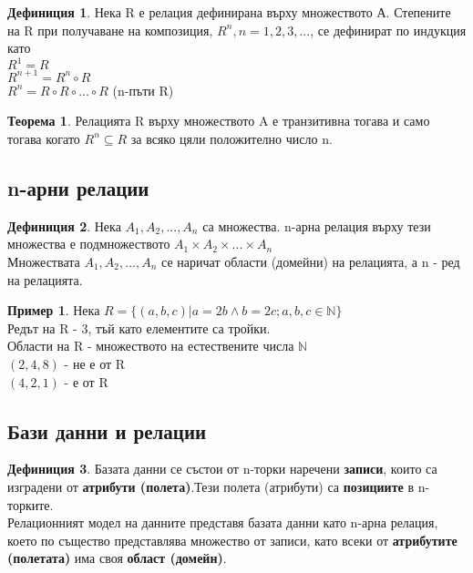 \documentclass[fleqn, 12pt]{article}
\theoremstyle{definition}
\newtheorem{example}{Пример}[subsection]
\newtheorem{definition}{Дефиниция}[subsection]
\newtheorem{theorem}{Теорема}[subsection]
\begin{document}
\begin{definition}
Нека R е релация дефинирана върху множеството А. Степените на R при получаване на композиция, $R^n, n = 1, 2, 3, ...$, се дефинират по индукция като \\
$R^1 = R$ \\
$R^{n+1} = R^n \circ R$ \\
$R^n = R \circ R \circ ... \circ R$ (n-пъти R)
\end{definition}

\begin{theorem}
Релацията R върху множеството A е транзитивна тогава и само тогава когато $R^n \subseteq R$ за всяко цяли положително число n.
\end{theorem}

\subsection{n-арни релации}

\begin{definition}
Нека $A_1, A_2, ..., A_n$ са множества. n-арна релация върху тези множества е подмножеството $A_1 \times A_2 \times ... \times A_n$ \\
Множествата $A_1, A_2, ..., A_n$ се наричат области (домейни) на релацията, а n - ред на релацията. 
\end{definition}

\begin{example}
Нека  $R = \{ (a, b, c) | a = 2b \land b = 2c; a,b,c \in \mathbb{N} \}$\\
Редът на R - 3, тъй като елементите са тройки. \\
Области на R - множеството на естествените числа $\mathbb{N}$ \\
$(2, 4, 8)$ - не е от R \\
$(4, 2, 1)$ - е от R
\end{example}

\subsection{Бази данни и релации}

\begin{definition}
Базата данни се състои от n-торки  наречени \textbf{записи}, които са изградени от \textbf{атрибути (полета)}.Тези полета (атрибути) са \textbf{позициите} в n-торките.\\
Релационният модел на данните представя базата данни като n-арна релация, което по същество представлява множество от записи, като всеки от \textbf{атрибутите (полетата)} има своя \textbf{област (домейн)}.
\end{definition}
\end{document}
